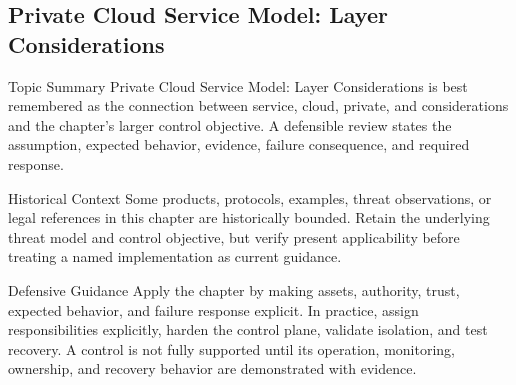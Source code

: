\documentclass[11pt,letterpaper]{article}
\begin{document}
\subsection*{Private Cloud Service Model: Layer Considerations}
\begin{CornellNotesTable}
\end{CornellNotesTable}
\begin{CornellSummaryBox}{Topic Summary}
Private Cloud Service Model: Layer Considerations is best remembered as the connection between service, cloud, private, and considerations and the chapter's larger control objective. A defensible review states the assumption, expected behavior, evidence, failure consequence, and required response.
\end{CornellSummaryBox}
\begin{CornellWarningBox}{Historical Context}
Some products, protocols, examples, threat observations, or legal references in this chapter are historically bounded. Retain the underlying threat model and control objective, but verify present applicability before treating a named implementation as current guidance.
\end{CornellWarningBox}
\begin{CornellOverviewBox}{Defensive Guidance}
Apply the chapter by making assets, authority, trust, expected behavior, and failure response explicit. In practice, assign responsibilities explicitly, harden the control plane, validate isolation, and test recovery. A control is not fully supported until its operation, monitoring, ownership, and recovery behavior are demonstrated with evidence.
\end{CornellOverviewBox}
\end{document}
